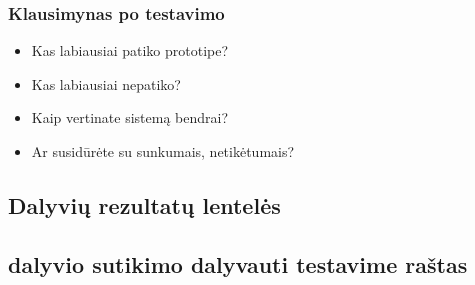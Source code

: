 \documentclass[oneside]{VUMIFPSkursinis}
\begin{document}
\subsubsection{Klausimynas po testavimo}
	\begin{itemize}
			\item Kas labiausiai patiko prototipe?
			\item Kas labiausiai nepatiko?
			\item Kaip vertinate sistemą bendrai?
			\item Ar susidūrėte su sunkumais, netikėtumais?
	\end{itemize}
\subsection{Dalyvių rezultatų lentelės}
\subsection{dalyvio sutikimo dalyvauti testavime raštas}
\end{document}
